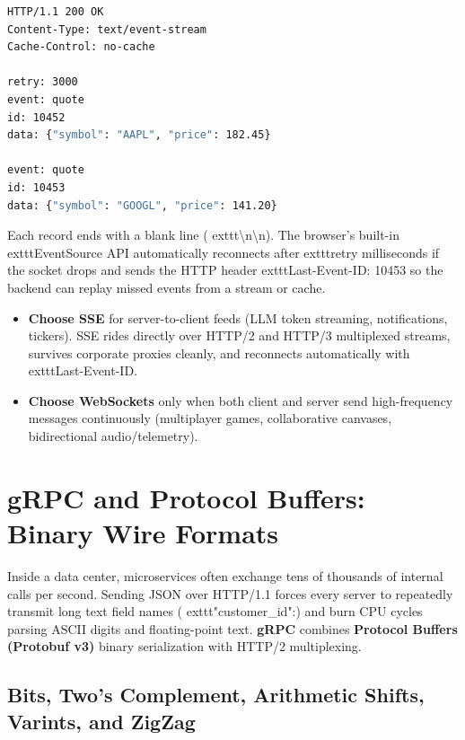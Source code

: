 \begin{lstlisting}[language=sh,caption={SSE Wire Format Stream}]
HTTP/1.1 200 OK
Content-Type: text/event-stream
Cache-Control: no-cache

retry: 3000
event: quote
id: 10452
data: {"symbol": "AAPL", "price": 182.45}

event: quote
id: 10453
data: {"symbol": "GOOGL", "price": 141.20}

\end{lstlisting}

Each record ends with a blank line (	exttt{\textbackslash n\textbackslash n}). The browser's built-in 	exttt{EventSource} API automatically reconnects after 	exttt{retry} milliseconds if the socket drops and sends the HTTP header 	exttt{Last-Event-ID: 10453} so the backend can replay missed events from a stream or cache.

\begin{intuitionbox}
\begin{itemize}[leftmargin=15pt]
  \item \textbf{Choose SSE} for server-to-client feeds (LLM token streaming, notifications, tickers). SSE rides directly over HTTP/2 and HTTP/3 multiplexed streams, survives corporate proxies cleanly, and reconnects automatically with 	exttt{Last-Event-ID}.
  \item \textbf{Choose WebSockets} only when both client and server send high-frequency messages continuously (multiplayer games, collaborative canvases, bidirectional audio/telemetry).
\end{itemize}
\end{intuitionbox}

\section{gRPC and Protocol Buffers: Binary Wire Formats}

Inside a data center, microservices often exchange tens of thousands of internal calls per second. Sending JSON over HTTP/1.1 forces every server to repeatedly transmit long text field names (	exttt{"customer\_id":}) and burn CPU cycles parsing ASCII digits and floating-point text. \textbf{gRPC} combines \textbf{Protocol Buffers (Protobuf v3)} binary serialization with HTTP/2 multiplexing.

\subsection{Bits, Two's Complement, Arithmetic Shifts, Varints, and ZigZag}

